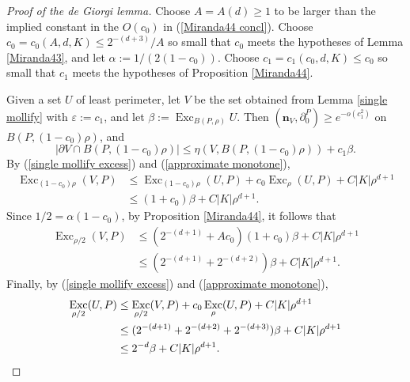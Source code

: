 \documentclass[reqno,11pt]{amsart}
\DeclareMathOperator{\Exc}{Exc}
\newcommand{\normal}{\mathbf n}
\theoremstyle{definition}
\numberwithin{equation}{section}
\begin{document}
\begin{proof}[Proof of the de Giorgi lemma]
Choose $A = A(d) \geq 1$ to be larger than the implied constant in the $O(c_0)$ in (\ref{Miranda44 concl}).
Choose $c_0 = c_0(A, d, K) \leq 2^{-(d + 3)}/A$ so small that $c_0$ meets the hypotheses of Lemma \ref{Miranda43}, and let $\alpha := 1/(2(1 - c_0))$.
Choose $c_1 = c_1(c_0, d, K) \leq c_0$ so small that $c_1$ meets the hypotheses of Proposition \ref{Miranda44}.

Given a set $U$ of least perimeter, let $V$ be the set obtained from Lemma \ref{single mollify} with $\varepsilon := c_1$, and let $\beta := \Exc_{B(P, \rho)} U$.
Then $(\normal_V, \partial_0^P) \geq e^{-o(c_1^2)}$ on $B(P, (1 - c_0)\rho)$, and
$$|\partial V \cap B(P, (1 - c_0)\rho)| \leq \eta(V, B(P, (1 - c_0)\rho)) + c_1 \beta.$$
By (\ref{single mollify excess}) and (\ref{approximate monotone}),
\begin{align*}
\Exc_{(1 - c_0) \rho} (V, P) &\leq \Exc_{(1 - c_0) \rho} (U, P) + c_0 \Exc_\rho (U, P) + C|K| \rho^{d + 1} \\
&\leq (1 + c_0) \beta + C |K| \rho^{d + 1}.
\end{align*}
Since $1/2 = \alpha (1 - c_0)$, by Proposition \ref{Miranda44}, it follows that
\begin{align*}
    \Exc_{\rho/2} (V, P) &\leq (2^{-(d + 1)} + Ac_0) (1 + c_0) \beta + C |K| \rho^{d + 1} \\
    &\leq (2^{-(d + 1)} + 2^{-(d + 2)}) \beta + C |K| \rho^{d + 1}.
\end{align*}
Finally, by (\ref{single mollify excess}) and (\ref{approximate monotone}),
\begin{align*}
    \Exc_{\rho/2} (U, P)
    &\leq \Exc_{\rho/2} (V, P) + c_0 \Exc_\rho (U, P) + C|K| \rho^{d + 1} \\
    &\leq (2^{-(d + 1)} + 2^{-(d + 2)} + 2^{-(d + 3)}) \beta + C |K| \rho^{d + 1}\\
    &\leq 2^{-d} \beta + C |K| \rho^{d + 1}. \qedhere
\end{align*}
\end{proof}


\printbibliography
\end{document}
